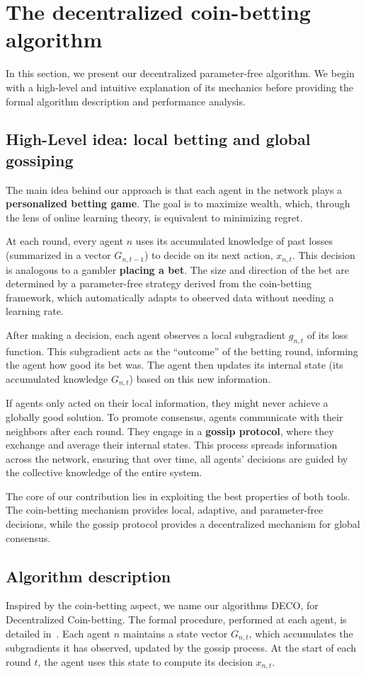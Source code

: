 \documentclass[journal]{IEEEtran}
\newcommand{\algname}{{DECO}\xspace}
\begin{document}
\section{The decentralized coin-betting algorithm}\label{sec:algorithm}
In this section, we present our decentralized parameter-free algorithm.
We begin with a high-level and intuitive explanation of its mechanics before providing the formal algorithm description and performance analysis.

\subsection{High-Level idea: local betting and global gossiping}
The main idea behind our approach is that each agent in the network plays a \textbf{personalized betting game}.
The goal is to maximize wealth, which, through the lens of online learning theory, is equivalent to minimizing regret.

At each round, every agent $n$ uses its accumulated knowledge of past losses (summarized in a vector $G_{n,t-1}$) to decide on its next action, $x_{n,t}$.
This decision is analogous to a gambler \textbf{placing a bet}.
The size and direction of the bet are determined by a parameter-free strategy derived from the coin-betting framework, which automatically adapts to observed data without needing a learning rate.

After making a decision, each agent observes a local subgradient $g_{n,t}$ of its loss function.
This subgradient acts as the ``outcome'' of the betting round, informing the agent how good its bet was.
The agent then updates its internal state (its accumulated knowledge $G_{n,t}$) based on this new information.

If agents only acted on their local information, they might never achieve a globally good solution.
To promote consensus, agents communicate with their neighbors after each round.
They engage in a \textbf{gossip protocol}, where they exchange and average their internal states.
This process spreads information across the network, ensuring that over time, all agents' decisions are guided by the collective knowledge of the entire system.

The core of our contribution lies in exploiting the best properties of both tools.
The coin-betting mechanism provides local, adaptive, and parameter-free decisions, while the gossip protocol provides a decentralized mechanism for global consensus.

\subsection{Algorithm description}
Inspired by the coin-betting aspect, we name our algorithms \algname{}, for Decentralized Coin-betting.
The formal procedure, performed at each agent, is detailed in~.
Each agent $n$ maintains a state vector $G_{n,t}$, which accumulates the subgradients it has observed, updated by the gossip process.
At the start of each round $t$, the agent uses this state to compute its decision $x_{n,t}$.
\end{document}
